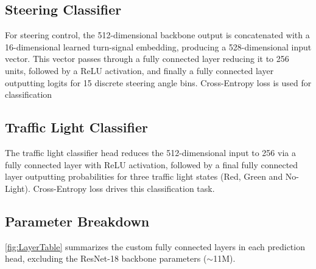 \documentclass{article} %
\begin{document}
\subsection{Steering Classifier}
For steering control, the 512-dimensional backbone output is concatenated with a 16-dimensional learned turn-signal embedding, producing a 528-dimensional input vector.
This vector passes through a fully connected layer reducing it to 256 units, followed by a ReLU activation, and finally a fully connected layer outputting logits for 15 discrete steering angle bins.
Cross-Entropy loss is used for classification

\subsection{Traffic Light Classifier}

The traffic light classifier head reduces the 512-dimensional input to 256 via a fully connected layer with ReLU activation, followed by a final fully connected layer outputting probabilities for three traffic light states (Red, Green and No-Light).
Cross-Entropy loss drives this classification task.

\subsection{Parameter Breakdown}

\autoref{fig:LayerTable} summarizes the custom fully connected layers in each prediction head, excluding the ResNet-18 backbone parameters ($\sim$11M).
\end{document}
